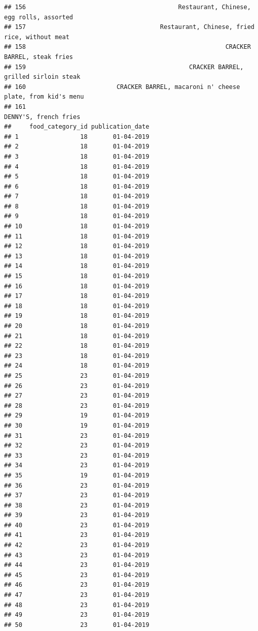 \documentclass[
]{article}
\begin{document}
\begin{verbatim}
## 156                                          Restaurant, Chinese, egg rolls, assorted
## 157                                     Restaurant, Chinese, fried rice, without meat
## 158                                                       CRACKER BARREL, steak fries
## 159                                             CRACKER BARREL, grilled sirloin steak
## 160                         CRACKER BARREL, macaroni n' cheese plate, from kid's menu
## 161                                                             DENNY'S, french fries
##     food_category_id publication_date
## 1                 18       01-04-2019
## 2                 18       01-04-2019
## 3                 18       01-04-2019
## 4                 18       01-04-2019
## 5                 18       01-04-2019
## 6                 18       01-04-2019
## 7                 18       01-04-2019
## 8                 18       01-04-2019
## 9                 18       01-04-2019
## 10                18       01-04-2019
## 11                18       01-04-2019
## 12                18       01-04-2019
## 13                18       01-04-2019
## 14                18       01-04-2019
## 15                18       01-04-2019
## 16                18       01-04-2019
## 17                18       01-04-2019
## 18                18       01-04-2019
## 19                18       01-04-2019
## 20                18       01-04-2019
## 21                18       01-04-2019
## 22                18       01-04-2019
## 23                18       01-04-2019
## 24                18       01-04-2019
## 25                23       01-04-2019
## 26                23       01-04-2019
## 27                23       01-04-2019
## 28                23       01-04-2019
## 29                19       01-04-2019
## 30                19       01-04-2019
## 31                23       01-04-2019
## 32                23       01-04-2019
## 33                23       01-04-2019
## 34                23       01-04-2019
## 35                19       01-04-2019
## 36                23       01-04-2019
## 37                23       01-04-2019
## 38                23       01-04-2019
## 39                23       01-04-2019
## 40                23       01-04-2019
## 41                23       01-04-2019
## 42                23       01-04-2019
## 43                23       01-04-2019
## 44                23       01-04-2019
## 45                23       01-04-2019
## 46                23       01-04-2019
## 47                23       01-04-2019
## 48                23       01-04-2019
## 49                23       01-04-2019
## 50                23       01-04-2019

\end{verbatim}
\end{document}

